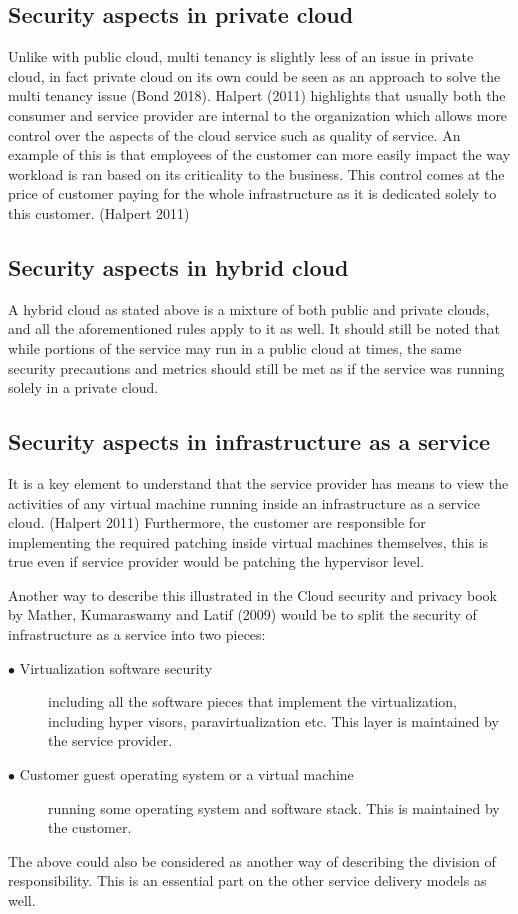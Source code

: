 \documentclass{article}
\begin{document}
\subsection{Security aspects in private cloud}
Unlike with public cloud, multi tenancy is slightly less of an issue in private cloud, in fact private cloud on its own could be seen as an approach to solve the multi tenancy issue (Bond 2018).
Halpert (2011) highlights that usually both the consumer and service provider are internal to the organization which allows more control over the aspects of the cloud service such as quality of service.
An example of this is that employees of the customer can more easily impact the way workload is ran based on its criticality to the business. This control comes at the price of customer paying for the whole infrastructure as it is dedicated solely to this customer. (Halpert 2011) 
\subsection{Security aspects in hybrid cloud}
A hybrid cloud as stated above is a mixture of both public and private clouds, and all the aforementioned rules apply to it as well. It should still be noted that while portions of the service may run in a public cloud at times, the same security precautions and metrics should still be met as if the service was running solely in a private cloud.
\subsection{Security aspects in infrastructure as a service}
It is a key element to understand that the service provider has means to view the activities of any virtual machine running inside an infrastructure as a service cloud. (Halpert 2011)
Furthermore, the customer are responsible for implementing the required patching inside virtual machines themselves, this is true even if service provider would be patching the hypervisor level.
\par
Another way to describe this illustrated in the Cloud security and privacy book by Mather, Kumaraswamy and Latif (2009) would be to split the security of infrastructure as a service into two pieces:
\begin{description}
	\item[$\bullet$ Virtualization software security] including all the software pieces that implement the virtualization, including hyper visors, paravirtualization etc. This layer is maintained by the service provider.
	\item[$\bullet$ Customer guest operating system or a virtual machine] running some operating system and software stack. This is maintained by the customer.
\end{description}
The above could also be considered as another way of describing the division of responsibility. This is an essential part on the other service delivery models as well.
\end{document}
